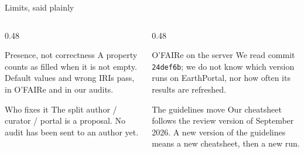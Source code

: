 \documentclass[aspectratio=169,10pt]{beamer}
\newcommand{\code}[1]{\texttt{\small #1}}
\begin{document}
\begin{frame}{Limits, said plainly}
  \begin{columns}[T]
    \begin{column}{0.48\textwidth}
      \begin{block}{Presence, not correctness}
        \small A property counts as filled when it is not empty. Default values and wrong IRIs pass,
        in O'FAIRe and in our audits.
      \end{block}
      \begin{block}{Who fixes it}
        \small The split author / curator / portal is a proposal. No audit has been sent to an
        author yet.
      \end{block}
    \end{column}
    \begin{column}{0.48\textwidth}
      \begin{block}{O'FAIRe on the server}
        \small We read commit \code{24def6b}; we do not know which version runs on EarthPortal, nor
        how often its results are refreshed.
      \end{block}
      \begin{block}{The guidelines move}
        \small Our cheatsheet follows the review version of September 2026. A new version of the
        guidelines means a new cheatsheet, then a new run.
      \end{block}
    \end{column}
  \end{columns}
\end{frame}
\end{document}

